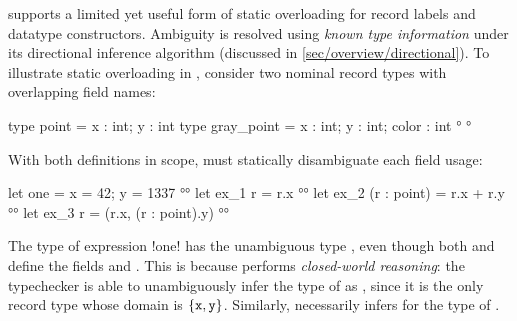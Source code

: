 \documentclass[acmsmall,screen,nonacm%
\Anonymous{,anonymous}{}%
\Final{}{,review}%
]{acmart}
\begin{document}
\OCaml supports a limited yet useful form of static overloading for record
labels and datatype constructors. Ambiguity is resolved using \emph{known
type information} under its directional inference algorithm (discussed in
\cref{sec/overview/directional}).
%
To illustrate static overloading in \OCaml, consider two nominal
record types with overlapping field names:
\begin{program}[input]
type point      = { x : int; y : int }
type gray_point = { x : int; y : int; color : int } °
°
\end{program}
With both definitions in scope, \OCaml must statically disambiguate each
field usage:
\begin{program}
let one = { x = 42; y = 1337 }                           °°
let ex_1 r = r.x                                         °°
let ex_2 (r : point) = r.x + r.y                         °°
let ex_3 r = (r.x, (r : point).y)                        °°
\end{program}
%
The type of expression \ocaml!one! has the unambiguous type ,
even though both  and  define the fields
 and .
This is because \OCaml performs \emph{closed-world reasoning}: the
typechecker is able to unambiguously
infer the type of  as , since it is the only record type
whose domain is $\{\mathtt{x}, \mathtt{y}\}$. Similarly,
 necessarily infers  for the type of .

\end{document}
